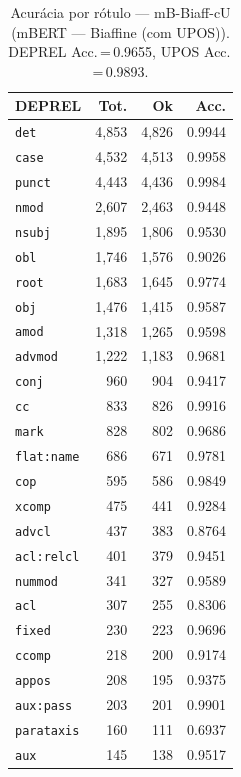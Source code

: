 \begin{table}[ht]
\centering
\caption{Acurácia por rótulo --- mB-Biaff-cU (mBERT — Biaffine (com UPOS)). DEPREL Acc.\,=\,0.9655, UPOS Acc.\,=\,0.9893.}
\label{tab:acc-predict-test-df-mbert-biaffine}
\begin{minipage}[t]{0.55\linewidth}
\centering\scriptsize
\begin{tabular}{lrrr}
\toprule
\textbf{DEPREL} & \textbf{Tot.} & \textbf{Ok} & \textbf{Acc.} \\
\midrule
\texttt{det} & 4,853 & 4,826 & 0.9944 \\
\texttt{case} & 4,532 & 4,513 & 0.9958 \\
\texttt{punct} & 4,443 & 4,436 & 0.9984 \\
\texttt{nmod} & 2,607 & 2,463 & 0.9448 \\
\texttt{nsubj} & 1,895 & 1,806 & 0.9530 \\
\texttt{obl} & 1,746 & 1,576 & 0.9026 \\
\texttt{root} & 1,683 & 1,645 & 0.9774 \\
\texttt{obj} & 1,476 & 1,415 & 0.9587 \\
\texttt{amod} & 1,318 & 1,265 & 0.9598 \\
\texttt{advmod} & 1,222 & 1,183 & 0.9681 \\
\texttt{conj} & 960 & 904 & 0.9417 \\
\texttt{cc} & 833 & 826 & 0.9916 \\
\texttt{mark} & 828 & 802 & 0.9686 \\
\texttt{flat\!:\!name} & 686 & 671 & 0.9781 \\
\texttt{cop} & 595 & 586 & 0.9849 \\
\texttt{xcomp} & 475 & 441 & 0.9284 \\
\texttt{advcl} & 437 & 383 & 0.8764 \\
\texttt{acl\!:\!relcl} & 401 & 379 & 0.9451 \\
\texttt{nummod} & 341 & 327 & 0.9589 \\
\texttt{acl} & 307 & 255 & 0.8306 \\
\texttt{fixed} & 230 & 223 & 0.9696 \\
\texttt{ccomp} & 218 & 200 & 0.9174 \\
\texttt{appos} & 208 & 195 & 0.9375 \\
\texttt{aux\!:\!pass} & 203 & 201 & 0.9901 \\
\texttt{parataxis} & 160 & 111 & 0.6937 \\
\texttt{aux} & 145 & 138 & 0.9517 \\

\end{tabular}
\end{minipage}
\end{table}
